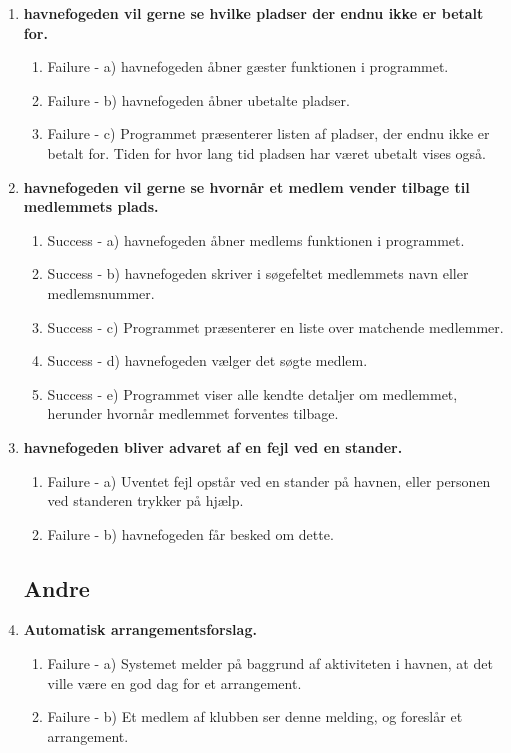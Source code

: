 \begin{enumerate}
	\item{\bf{havnefogeden vil gerne se hvilke pladser der endnu ikke er betalt for.}}
	  \begin{enumerate}
			\item Failure -  a) havnefogeden åbner gæster funktionen i programmet.
			\item Failure -  b) havnefogeden åbner ubetalte pladser.
			\item Failure -  c) Programmet præsenterer listen af pladser, der endnu ikke er betalt for. Tiden for hvor lang tid pladsen har været ubetalt vises også.
	   \end{enumerate}
	   
	\item{\bf{havnefogeden vil gerne se hvornår et medlem vender tilbage til medlemmets plads.}}
	  \begin{enumerate}
			\item Success -  a) havnefogeden åbner medlems funktionen i programmet.
			\item Success -  b) havnefogeden skriver i søgefeltet medlemmets navn eller medlemsnummer.
			\item Success -  c) Programmet præsenterer en liste over matchende medlemmer.
			\item Success -  d) havnefogeden vælger det søgte medlem.
			\item Success -  e) Programmet viser alle kendte detaljer om medlemmet, herunder hvornår medlemmet forventes tilbage.
	   \end{enumerate}
	   
	\item{\bf{havnefogeden bliver advaret af en fejl ved en stander.}}
	  \begin{enumerate}
			\item Failure -  a) Uventet fejl opstår ved en stander på havnen, eller personen ved standeren trykker på hjælp.
			\item Failure -  b) havnefogeden får besked om dette.
	   \end{enumerate}

\subsection{Andre}
	\item{\bf{Automatisk arrangementsforslag.}}
	  \begin{enumerate}
			\item Failure -  a) Systemet melder på baggrund af aktiviteten i havnen, at det ville være en god dag for et arrangement.
			\item Failure -  b) Et medlem af klubben ser denne melding, og foreslår et arrangement.
	   \end{enumerate}
      

\end{enumerate}

